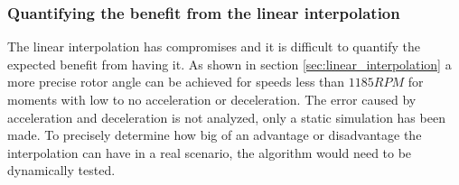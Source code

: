 \subsubsection{Quantifying the benefit from the linear interpolation}
The linear interpolation has compromises and it is difficult to quantify the expected benefit from having it. As shown in section \ref{sec:linear_interpolation} a more precise rotor angle can be achieved for speeds less than $1185RPM$ for moments with low to no acceleration or deceleration. The error caused by acceleration and deceleration is not analyzed, only a static simulation has been made. To precisely determine how big of an advantage or disadvantage the interpolation can have in a real scenario, the algorithm would need to be dynamically tested.




 
 